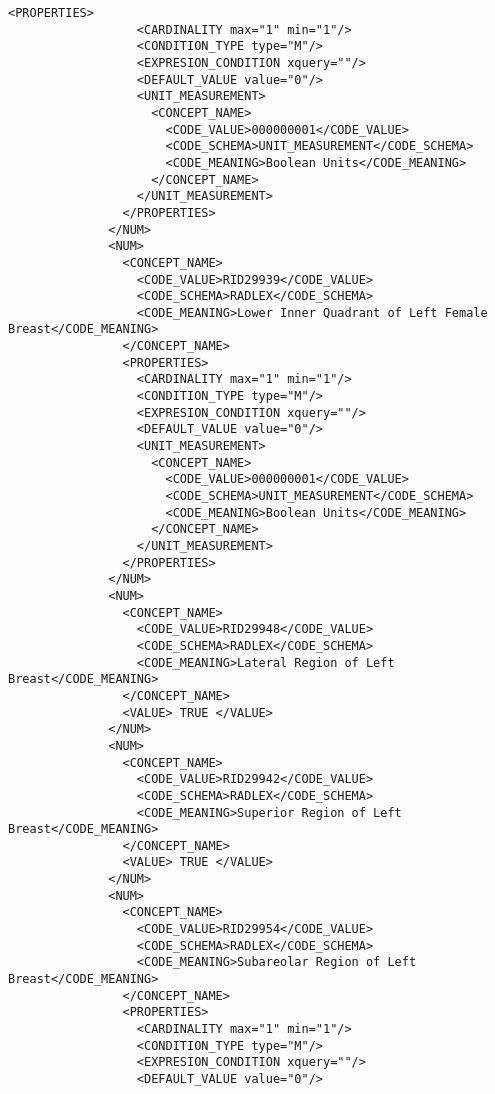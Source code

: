 \begin{lstlisting}[label=dicom-template,caption=Plantilla de un informe estructurado de una exploración de mama]
                <PROPERTIES>
                  <CARDINALITY max="1" min="1"/>
                  <CONDITION_TYPE type="M"/>
                  <EXPRESION_CONDITION xquery=""/>
                  <DEFAULT_VALUE value="0"/>
                  <UNIT_MEASUREMENT>
                    <CONCEPT_NAME>
                      <CODE_VALUE>000000001</CODE_VALUE>
                      <CODE_SCHEMA>UNIT_MEASUREMENT</CODE_SCHEMA>
                      <CODE_MEANING>Boolean Units</CODE_MEANING>
                    </CONCEPT_NAME>
                  </UNIT_MEASUREMENT>
                </PROPERTIES>
              </NUM>
              <NUM>
                <CONCEPT_NAME>
                  <CODE_VALUE>RID29939</CODE_VALUE>
                  <CODE_SCHEMA>RADLEX</CODE_SCHEMA>
                  <CODE_MEANING>Lower Inner Quadrant of Left Female Breast</CODE_MEANING>
                </CONCEPT_NAME>
                <PROPERTIES>
                  <CARDINALITY max="1" min="1"/>
                  <CONDITION_TYPE type="M"/>
                  <EXPRESION_CONDITION xquery=""/>
                  <DEFAULT_VALUE value="0"/>
                  <UNIT_MEASUREMENT>
                    <CONCEPT_NAME>
                      <CODE_VALUE>000000001</CODE_VALUE>
                      <CODE_SCHEMA>UNIT_MEASUREMENT</CODE_SCHEMA>
                      <CODE_MEANING>Boolean Units</CODE_MEANING>
                    </CONCEPT_NAME>
                  </UNIT_MEASUREMENT>
                </PROPERTIES>
              </NUM>
              <NUM>
                <CONCEPT_NAME>
                  <CODE_VALUE>RID29948</CODE_VALUE>
                  <CODE_SCHEMA>RADLEX</CODE_SCHEMA>
                  <CODE_MEANING>Lateral Region of Left Breast</CODE_MEANING>
                </CONCEPT_NAME>
                <VALUE> TRUE </VALUE>
              </NUM>
              <NUM>
                <CONCEPT_NAME>
                  <CODE_VALUE>RID29942</CODE_VALUE>
                  <CODE_SCHEMA>RADLEX</CODE_SCHEMA>
                  <CODE_MEANING>Superior Region of Left Breast</CODE_MEANING>
                </CONCEPT_NAME>
                <VALUE> TRUE </VALUE>
              </NUM>
              <NUM>
                <CONCEPT_NAME>
                  <CODE_VALUE>RID29954</CODE_VALUE>
                  <CODE_SCHEMA>RADLEX</CODE_SCHEMA>
                  <CODE_MEANING>Subareolar Region of Left Breast</CODE_MEANING>
                </CONCEPT_NAME>
                <PROPERTIES>
                  <CARDINALITY max="1" min="1"/>
                  <CONDITION_TYPE type="M"/>
                  <EXPRESION_CONDITION xquery=""/>
                  <DEFAULT_VALUE value="0"/>

\end{lstlisting}
